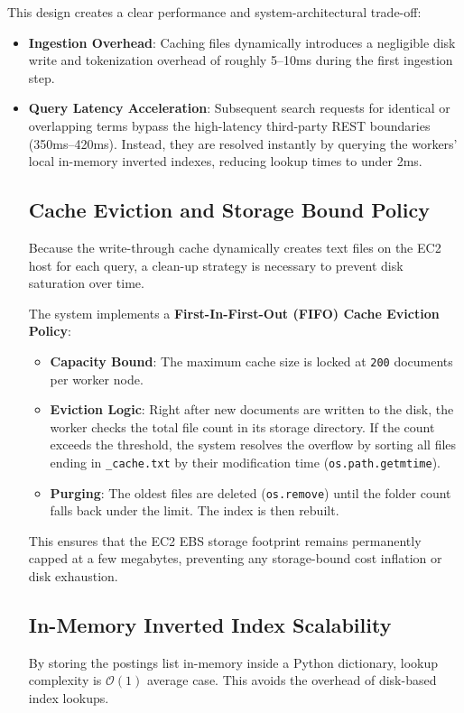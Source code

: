 \documentclass[11pt,a4paper]{article}
\begin{document}
This design creates a clear performance and system-architectural trade-off:
\begin{itemize}
    \item \textbf{Ingestion Overhead}: Caching files dynamically introduces a negligible disk write and tokenization overhead of roughly 5--10ms during the first ingestion step.
    \item \textbf{Query Latency Acceleration}: Subsequent search requests for identical or overlapping terms bypass the high-latency third-party REST boundaries (350ms--420ms). Instead, they are resolved instantly by querying the workers' local in-memory inverted indexes, reducing lookup times to under 2ms.
\subsection{Cache Eviction and Storage Bound Policy}
Because the write-through cache dynamically creates text files on the EC2 host for each query, a clean-up strategy is necessary to prevent disk saturation over time.

The system implements a \textbf{First-In-First-Out (FIFO) Cache Eviction Policy}:
\begin{itemize}
    \item \textbf{Capacity Bound}: The maximum cache size is locked at \texttt{200} documents per worker node.
    \item \textbf{Eviction Logic}: Right after new documents are written to the disk, the worker checks the total file count in its storage directory. If the count exceeds the threshold, the system resolves the overflow by sorting all files ending in \texttt{\_cache.txt} by their modification time (\texttt{os.path.getmtime}).
    \item \textbf{Purging}: The oldest files are deleted (\texttt{os.remove}) until the folder count falls back under the limit. The index is then rebuilt.
\end{itemize}
This ensures that the EC2 EBS storage footprint remains permanently capped at a few megabytes, preventing any storage-bound cost inflation or disk exhaustion.

\subsection{In-Memory Inverted Index Scalability}
By storing the postings list in-memory inside a Python dictionary, lookup complexity is $\mathcal{O}(1)$ average case. This avoids the overhead of disk-based index lookups. 


\end{itemize}
\end{document}
